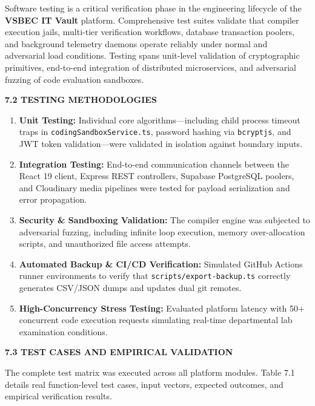 {\fontsize{12pt}{17.5pt}\selectfont
Software testing is a critical verification phase in the engineering lifecycle of the \textbf{VSBEC IT Vault} platform. Comprehensive test suites validate that compiler execution jails, multi-tier verification workflows, database transaction poolers, and background telemetry daemons operate reliably under normal and adversarial load conditions. Testing spans unit-level validation of cryptographic primitives, end-to-end integration of distributed microservices, and adversarial fuzzing of code evaluation sandboxes.

\vspace{0.3cm}
{\fontsize{14pt}{18pt}\selectfont\bfseries 7.2 TESTING METHODOLOGIES\par}
\vspace{0.2cm}
\begin{enumerate}[noitemsep,topsep=2pt,leftmargin=*]
  \item \textbf{Unit Testing:} Individual core algorithms---including child process timeout traps in \texttt{codingSandboxService.ts}, password hashing via \texttt{bcryptjs}, and JWT token validation---were validated in isolation against boundary inputs.
  \item \textbf{Integration Testing:} End-to-end communication channels between the React 19 client, Express REST controllers, Supabase PostgreSQL poolers, and Cloudinary media pipelines were tested for payload serialization and error propagation.
  \item \textbf{Security \& Sandboxing Validation:} The compiler engine was subjected to adversarial fuzzing, including infinite loop execution, memory over-allocation scripts, and unauthorized file access attempts.
  \item \textbf{Automated Backup \& CI/CD Verification:} Simulated GitHub Actions runner environments to verify that \texttt{scripts/export-backup.ts} correctly generates CSV/JSON dumps and updates dual git remotes.
  \item \textbf{High-Concurrency Stress Testing:} Evaluated platform latency with 50+ concurrent code execution requests simulating real-time departmental lab examination conditions.
\end{enumerate}

\vspace{0.4cm}
{\fontsize{14pt}{18pt}\selectfont\bfseries 7.3 TEST CASES AND EMPIRICAL VALIDATION\par}
\vspace{0.2cm}

The complete test matrix was executed across all platform modules. Table 7.1 details real function-level test cases, input vectors, expected outcomes, and empirical verification results.\par}

